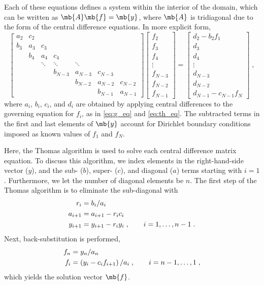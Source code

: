 \documentclass[11pt]{article}
\begin{document}
Each of these equations defines a system within the interior of the domain, which can be written as $\mb{A} \mb{f} = \mb{y}$, where $\mb{A}$ is tridiagonal due to the form of the central difference equations. In more explicit form,
\begin{equation}
\begin{bmatrix}
a_2 & c_2 &        &         &         &         &         \\
b_3 & a_3 &    c_3 &         &         &         &         \\
    & b_4 &    a_4 & c_4     &         &         &         \\
    &     & \ddots & \ddots  & \ddots  &         &         \\
    &     &        & b_{N-3} & a_{N-3} & c_{N-3} &         \\
    &     &        &         & b_{N-2} & a_{N-2} & c_{N-2} \\
    &     &        &         &         & b_{N-1} & a_{N-1}
\end{bmatrix}
\begin{bmatrix}
f_2 \\
f_3 \\
f_4 \\
\vdots \\
f_{N-3} \\
f_{N-2} \\
f_{N-1}
\end{bmatrix}
=
\begin{bmatrix}
d_2 - b_2 f_1 \\
d_3 \\
d_4 \\
\vdots \\
d_{N-3} \\
d_{N-2} \\
d_{N-1} - c_{N-1} f_N
\end{bmatrix}
\;,
\end{equation}
where $a_i$, $b_i$, $c_i$, and $d_i$ are obtained by applying central differences to the governing equation for $f_i$, as in \eqref{eq:g_eq} and \eqref{eq:th_eq}. The subtracted terms in the first and last elements of $\mb{y}$ account for Dirichlet boundary conditions imposed as known values of $f_1$ and $f_N$.

Here, the Thomas algorithm is used to solve each central difference matrix equation. To discuss this algorithm, we index elements in the right-hand-side vector ($y$), and the sub- ($b$), super- ($c$), and diagonal ($a$) terms starting with $i=1$. Furthermore, we let the number of diagonal elements be $n$. The first step of the Thomas algorithm is to eliminate the sub-diagonal with
\begin{align}
r_i &= b_i / a_i \notag \\
a_{i+1} &= a_{i+1} - r_i c_i \notag \\
y_{i+1} &= y_{i+1} - r_i y_i
\;, \qquad i = 1,\dots,n-1
\;.
\end{align}
Next, back-substitution is performed,
\begin{align}
f_n &= y_n / a_n \notag \\
f_i &= \left( y_i - c_i f_{i+1} \right) / a_i
\;, \qquad i = n-1,\dots,1
\;,
\end{align}
which yields the solution vector $\mb{f}$.
\end{document}
